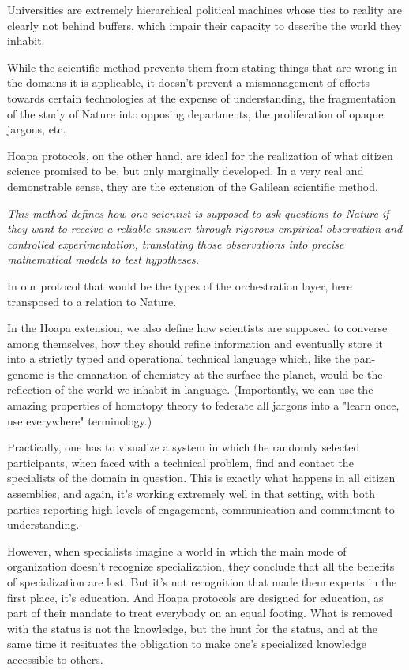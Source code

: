 \documentclass[11pt]{article}
\begin{document}
Universities are extremely hierarchical political machines whose ties to reality are clearly not behind buffers, which impair their capacity to describe the world they inhabit.

While the scientific method prevents them from stating things that are wrong in the domains it is applicable, it doesn't prevent a mismanagement of efforts towards certain technologies at the expense of understanding, the fragmentation of the study of Nature into opposing departments, the proliferation of opaque jargons, etc.

Hoapa protocols, on the other hand, are ideal for the realization of what citizen science promised to be, but only marginally developed. In a very real and demonstrable sense, they are the extension of the Galilean scientific method.

\emph{This method defines how one scientist is supposed to ask questions to Nature if they want to receive a reliable answer: through rigorous empirical observation and controlled experimentation, translating those observations into precise mathematical models to test hypotheses.}

In our protocol that would be the types of the orchestration layer, here transposed to a relation to Nature.

In the Hoapa extension, we also define how scientists are supposed to converse among themselves, how they should refine information and eventually store it into a strictly typed and operational technical language which, like the pan-genome is the emanation of chemistry at the surface the planet, would be the reflection of the world we inhabit in language. (Importantly, we can use the amazing properties of homotopy theory to federate all jargons into a "learn once, use everywhere" terminology.)

Practically, one has to visualize a system in which the randomly selected participants, when faced with a technical problem, find and contact the specialists of the domain in question. This is exactly what happens in all citizen assemblies, and again, it's working extremely well in that setting, with both parties reporting high levels of engagement, communication and commitment to understanding.

However, when specialists imagine a world in which the main mode of organization doesn't recognize specialization, they conclude that all the benefits of specialization are lost. But it's not recognition that made them experts in the first place, it's education. And Hoapa protocols are designed for education, as part of their mandate to treat everybody on an equal footing. What is removed with the status is not the knowledge, but the hunt for the status, and at the same time it resituates the obligation to make one's specialized knowledge accessible to others.
\end{document}
